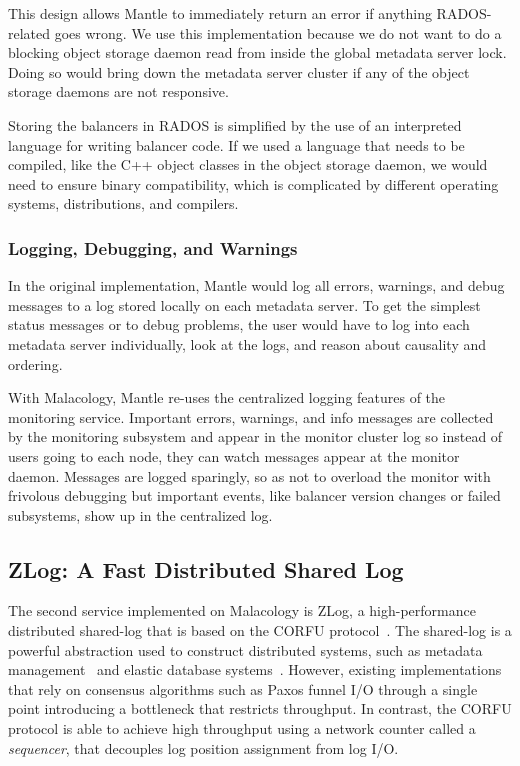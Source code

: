 This design allows Mantle to immediately return an error if anything
RADOS-related goes wrong.  We use this implementation because we do not want to
do a blocking object storage daemon read from inside the global metadata server lock. Doing so would bring
down the metadata server cluster if any of the object storage daemons are not responsive.

Storing the balancers in RADOS is simplified by the use of an interpreted
language for writing balancer code. If we used a language that needs to be
compiled, like the C++ object classes in the object storage daemon, we would need to ensure
binary compatibility, which is complicated by different operating systems,
distributions, and compilers.

\subsubsection{Logging, Debugging, and Warnings}

In the original implementation, Mantle would log all errors, warnings, and
debug messages to a log stored locally on each metadata server. To get the simplest
status messages or to debug problems, the user would have to log into each metadata server
individually, look at the logs, and reason about causality and ordering.

With Malacology, Mantle re-uses the centralized logging features of the
monitoring service. Important errors, warnings, and info messages are collected
by the monitoring subsystem and appear in the monitor cluster log so instead of
users going to each node, they can watch messages appear at the monitor daemon.
Messages are logged sparingly, so as not to overload the monitor with frivolous
debugging but important events, like balancer version changes or failed
subsystems, show up in the centralized log.

\subsection{ZLog: A Fast Distributed Shared Log}
\label{sec:zlog}

The second service implemented on Malacology is ZLog, a high-performance
distributed shared-log that is based on the CORFU
protocol~\cite{balakrishnan_corfu_2012}. The shared-log is a powerful
abstraction used to construct distributed systems, such as metadata
management~\cite{balakrishnan:sosp13} and elastic database
systems~\cite{bernstein:cidr11,bernstein:vldb11,bernstein:sigmod15}.  However,
existing implementations that rely on consensus algorithms such as Paxos funnel
I/O through a single point introducing a bottleneck that restricts throughput.
In contrast, the CORFU protocol is able to achieve high throughput using a
network counter called a \emph{sequencer}, that decouples log position
assignment from log I/O.

